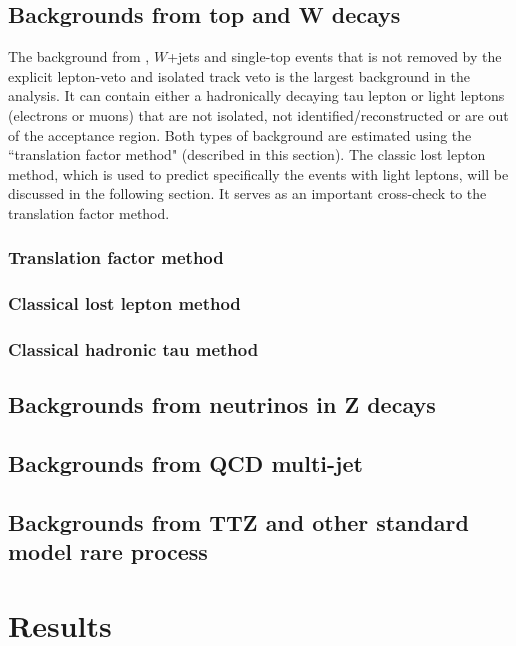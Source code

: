 \subsection{Backgrounds from top and W decays}
The background from \ttbar, $W$+jets and single-top events that is not removed by the explicit lepton-veto and isolated track veto is the largest background in the analysis. It can contain either a hadronically decaying tau lepton or light leptons (electrons or muons) that are not isolated, not identified/reconstructed or are out of the acceptance region. Both types of background are estimated using the ``translation factor method" (described in this section). The classic lost lepton method, which is used to predict specifically the events with light leptons, will be discussed in the following section. It serves as an important cross-check to the translation factor method.

\subsubsection{Translation factor method}
\label{sec:c4bgtf}


\clearpage
\subsubsection{Classical lost lepton method}
\label{sec:c4bgll}


\subsubsection{Classical hadronic tau method}
\label{sec:c4bghadtau}


\subsection{Backgrounds from neutrinos in Z decays}
\label{sec:c4bgzinv}


\subsection{Backgrounds from QCD multi-jet}
\label{sec:c4bgqcd}


\subsection{Backgrounds from TTZ and other standard model rare process}
\label{sec:c4bgttzrare}


\section{Results}
\label{sec:c4results}


